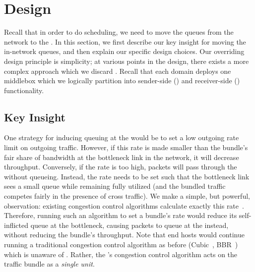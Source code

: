 \section{Design}\label{s:design}
%

Recall that in order to do scheduling, we need to move the queues from the network to the \name. 
In this section, we first describe our key insight for moving the in-network queues, and then explain our specific design choices. 
Our overriding design principle is simplicity; at various points in the design, there exists a more complex approach which we discard .
Recall that each domain deploys one \name middlebox which we logically partition into sender-side (\inbox) and receiver-side (\outbox) functionality.

\subsection{Key Insight}\label{s:design:key}
One strategy for inducing queuing at the \inbox would be to set a low outgoing rate limit on outgoing traffic. 
However, if this rate is made smaller than the bundle's fair share of bandwidth at the bottleneck link in the network, it will decrease throughput. 
Conversely, if the rate is too high, packets will pass through the \inbox without queueing.
Instead, the rate needs to be set such that the bottleneck link sees a small queue while remaining fully utilized (and the bundled traffic competes fairly in the presence of cross traffic). 
We make a simple, but powerful, observation: existing congestion control algorithms calculate exactly this rate~\cite{Jacobson88}. 
Therefore, running such an algorithm to set a bundle's rate would reduce its self-inflicted queue at the bottleneck, causing packets to queue at the \inbox instead, without reducing the bundle's throughput.
Note that end hosts would continue running a traditional congestion control algorithm as before (\eg Cubic~\cite{cubic}, BBR~\cite{bbr}) which is unaware of \name.
Rather, the \inbox's congestion control algorithm acts on the traffic bundle as a \emph{single unit}.

